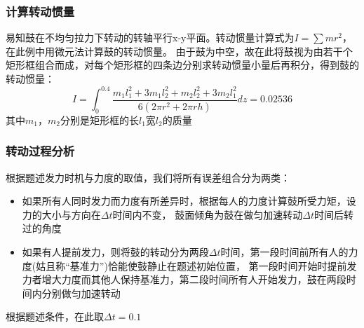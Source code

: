 \documentclass[withoutpreface,bwprint]{cumcmthesis} %
\begin{document}
\subsubsection{计算转动惯量}
易知鼓在不均匀拉力下转动的转轴平行x-y平面。转动惯量计算式为$I=\sum mr^2$，在此例中用微元法计算鼓的转动惯量。
由于鼓为中空，故在此将鼓视为由若干个矩形框组合而成，对每个矩形框的四条边分别求转动惯量小量后再积分，得到鼓的转动惯量：
$$I=\int_{0}^{0.4} \frac{m_{1}l_{1}^{2}+3m_{1}l_{2}^{2}+m_{2}l_{2}^{2}+3m_{2} l_{1}^{2}}{6(2\pi r^{2}+ 2\pi rh)}dz=0.02536$$
其中$m_1$，$m_2$分别是矩形框的长$l_1$宽$l_2$的质量

\subsubsection{转动过程分析}
根据题述发力时机与力度的取值，我们将所有误差组合分为两类：
\begin{itemize}
	\item 如果所有人同时发力而力度有所差异时，根据每人的力度计算鼓所受力矩，设力的大小与方向在$\Delta t$时间内不变，
	鼓面倾角为鼓在做匀加速转动$\Delta t$时间后转过的角度
	\item 如果有人提前发力，则将鼓的转动分为两段$\Delta t$时间，第一段时间前所有人的力度(姑且称“基准力”)恰能使鼓静止在题述初始位置，
	第一段时间开始时提前发力者增大力度而其他人保持基准力，第二段时间所有人开始发力，鼓在两段时间内分别做匀加速转动	
\end{itemize}
根据题述条件，在此取$\Delta t=0.1$
\end{document}
